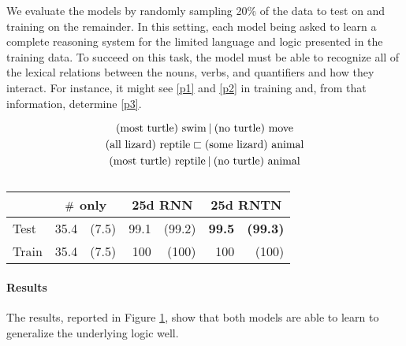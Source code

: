 
We evaluate the models by randomly sampling 20\% of the data to
test on and training on the remainder. In this setting, each model being asked to learn a
complete reasoning system for the limited language and logic presented
in the training data. To succeed on this task, the model must be able
to recognize all of the lexical relations between the nouns, verbs,
and quantifiers and how they interact. For instance, it might see
\eqref{p1} and \eqref{p2} in training and, from that information,
determine \eqref{p3}.

\vspace{-0.6cm}
\begin{gather}
  \text{(most turtle) swim} \mathbin{|} \text{(no turtle) move}\label{p1}
  \\
  \text{(all lizard) reptile} \sqsubset  \text{(some lizard) animal}\label{p2}
  \\
  \text{(most turtle) reptile} \mathbin{|} \text{(no turtle) animal}\label{p3}
\end{gather}\vspace{-0.8cm}

\begin{table}[tp]
  \centering \small
  \begin{tabular}{ l r@{ \ }r r@{ \ }r r@{ \ }r }
    \toprule
    ~&\multicolumn{2}{c}{$\mathbin{\#}$ only} & \multicolumn{2}{c}{25d RNN}  & \multicolumn{2}{c}{25d RNTN}\\
    \midrule
    Test & 35.4 &(7.5) &	99.1&(99.2)& \textbf{99.5} & \textbf{(99.3)}\\
    Train & 35.4 &(7.5) &	100&		(100)&	100&	(100)\\	
    \bottomrule
  \end{tabular}
  \caption{}
  \label{qresultstable}
\end{table} 
%
%
\paragraph{Results} The results, reported in Figure \ref{qresultstable}, show that both models are able to learn to generalize the underlying logic well.
